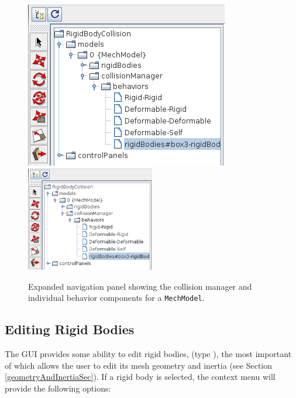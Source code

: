 \documentclass{article}
\begin{document}
\begin{figure}[h]
\begin{center}
\iflatexml
\includegraphics[]{images/setCollisionsNavpanel}
\else
\includegraphics[width=0.50\textwidth]{images/setCollisionsNavpanel}
\fi
\end{center}
\caption{Expanded navigation panel showing the collision manager and
individual behavior components for a {\tt MechModel}.}
\label{setCollisionsNavpanel:fig}
\end{figure}

\subsection{Editing Rigid Bodies}

The GUI provides some ability to edit rigid bodies,
(type ), 
the most important
of which allows the user to edit its mesh geometry and inertia (see
Section \ref{geometryAndInertiaSec}).  If a rigid body is selected, the context
menu will provide the following options:
\end{document}
